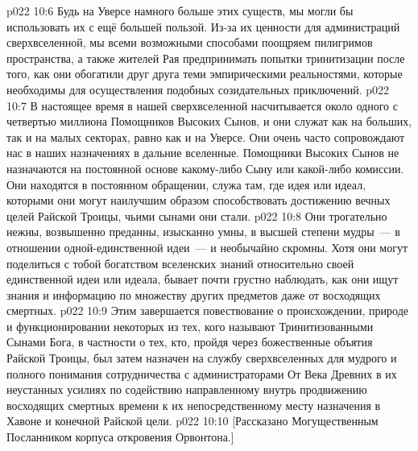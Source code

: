 \vs p022 10:6 Будь на Уверсе намного больше этих существ, мы могли бы использовать их с ещё большей пользой. Из\hyp{}за их ценности для администраций сверхвселенной, мы всеми возможными способами поощряем пилигримов пространства, а также жителей Рая предпринимать попытки тринитизации после того, как они обогатили друг друга теми эмпирическими реальностями, которые необходимы для осуществления подобных созидательных приключений.
\vs p022 10:7 \pc В настоящее время в нашей сверхвселенной насчитывается около одного с четвертью миллиона Помощников Высоких Сынов, и они служат как на больших, так и на малых секторах, равно как и на Уверсе. Они очень часто сопровождают нас в наших назначениях в дальние вселенные. Помощники Высоких Сынов не назначаются на постоянной основе какому\hyp{}либо Сыну или какой\hyp{}либо комиссии. Они находятся в постоянном обращении, служа там, где идея или идеал, которыми они  могут наилучшим образом способствовать достижению вечных целей Райской Троицы, чьими сынами они стали.
\vs p022 10:8 Они трогательно нежны, возвышенно преданны, изысканно умны, в высшей степени мудры~--- в отношении одной\hyp{}единственной идеи~--- и необычайно скромны. Хотя они могут поделиться с тобой богатством вселенских знаний относительно своей единственной идеи или идеала, бывает почти грустно наблюдать, как они ищут знания и информацию по множеству других предметов даже от восходящих смертных.
\vs p022 10:9 \pc Этим завершается повествование о происхождении, природе и функционировании некоторых из тех, кого называют Тринитизованными Сынами Бога, в частности о тех, кто, пройдя через божественные объятия Райской Троицы, был затем назначен на службу сверхвселенных для мудрого и полного понимания сотрудничества с администраторами От Века Древних в их неустанных усилиях по содействию направленному внутрь продвижению восходящих смертных времени к их непосредственному месту назначения в Хавоне и конечной Райской цели.
\vsetoff
\vs p022 10:10 [Рассказано Могущественным Посланником корпуса откровения Орвонтона.]
\quizlink
